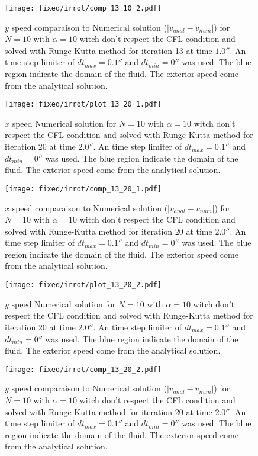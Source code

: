\begin{figure}
\texttt{[image: fixed/irrot/comp\_13\_10\_2.pdf]}
\caption{$y$ speed comparaison to Numerical solution ($|v_{anal}-v_{num}|$) for $N=10$ with $\alpha=10$ witch don't respect the CFL condition and solved with Runge-Kutta method
for iteration 13 at time $\unit{1.0}{\second}$.
An time step limiter of $dt_{max}=\unit{0.1}{\second}$ and $dt_{min}=\unit{0}{\second}$ was used.
The blue region indicate the domain of the fluid. The exterior speed come from the analytical solution.
\label{fix:comp_13_10_2}
}
\end{figure}

\begin{figure}
\texttt{[image: fixed/irrot/plot\_13\_20\_1.pdf]}
\caption{$x$ speed Numerical solution for $N=10$ with $\alpha=10$ witch don't respect the CFL condition and solved with Runge-Kutta method
for iteration 20 at time $\unit{2.0}{\second}$.
An time step limiter of $dt_{max}=\unit{0.1}{\second}$ and $dt_{min}=\unit{0}{\second}$ was used.
The blue region indicate the domain of the fluid. The exterior speed come from the analytical solution.
\label{fix:plot_13_20_1}
}
\end{figure}

\begin{figure}
\texttt{[image: fixed/irrot/comp\_13\_20\_1.pdf]}
\caption{$x$ speed comparaison to Numerical solution ($|v_{anal}-v_{num}|$) for $N=10$ with $\alpha=10$ witch don't respect the CFL condition and solved with Runge-Kutta method
for iteration 20 at time $\unit{2.0}{\second}$.
An time step limiter of $dt_{max}=\unit{0.1}{\second}$ and $dt_{min}=\unit{0}{\second}$ was used.
The blue region indicate the domain of the fluid. The exterior speed come from the analytical solution.
\label{fix:comp_13_20_1}
}
\end{figure}
\begin{figure}
\texttt{[image: fixed/irrot/plot\_13\_20\_2.pdf]}
\caption{$y$ speed Numerical solution for $N=10$ with $\alpha=10$ witch don't respect the CFL condition and solved with Runge-Kutta method
for iteration 20 at time $\unit{2.0}{\second}$.
An time step limiter of $dt_{max}=\unit{0.1}{\second}$ and $dt_{min}=\unit{0}{\second}$ was used.
The blue region indicate the domain of the fluid. The exterior speed come from the analytical solution.
\label{fix:plot_13_20_2}
}
\end{figure}

\begin{figure}
\texttt{[image: fixed/irrot/comp\_13\_20\_2.pdf]}
\caption{$y$ speed comparaison to Numerical solution ($|v_{anal}-v_{num}|$) for $N=10$ with $\alpha=10$ witch don't respect the CFL condition and solved with Runge-Kutta method
for iteration 20 at time $\unit{2.0}{\second}$.
An time step limiter of $dt_{max}=\unit{0.1}{\second}$ and $dt_{min}=\unit{0}{\second}$ was used.
The blue region indicate the domain of the fluid. The exterior speed come from the analytical solution.
\label{fix:comp_13_20_2}
}
\end{figure}

